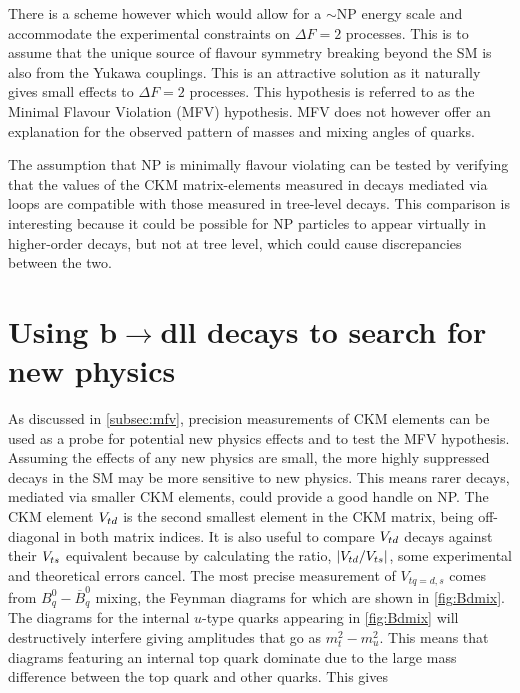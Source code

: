 There is a scheme however which would allow for a $\sim$\tev NP energy scale and accommodate the experimental constraints on $\Delta F = 2$ processes. This is to assume that the unique source of flavour symmetry breaking beyond the SM is also from the Yukawa couplings. This is an attractive solution as it naturally gives small effects to $\Delta F = 2$ processes. This hypothesis is referred to as the Minimal Flavour Violation (MFV) hypothesis. MFV does not however offer an explanation for the observed pattern of masses and mixing angles of quarks.

The assumption that NP is minimally flavour violating can be tested by verifying that the values of the CKM matrix-elements measured in decays mediated via loops are compatible with those measured in tree-level decays. This comparison is interesting because it could be possible for NP particles to appear virtually in higher-order decays, but not at tree level, which could cause discrepancies between the two.
\section[Using b\to dll decays to search for new physics]{Using $\mathbold{b\to dll}$ decays to search for new physics}

\label{sec:bdll}
As discussed in \autoref{subsec:mfv}, precision measurements of CKM elements can be used as a probe for potential new physics effects and to test the MFV hypothesis. Assuming the effects of any new physics are small, the more highly suppressed decays in the SM may be more sensitive to new physics. This means rarer decays, mediated via smaller CKM elements, could provide a good handle on NP. The CKM element ${V_{{t}{d}}}$ is the second smallest element in the CKM matrix, being off-diagonal in both matrix indices. It is also useful to compare ${V_{{t}{d}}}$ decays against their ${V_{{t}{s}}}$ equivalent because by calculating the ratio, $|{V_{{t}{d}}}/{V_{{t}{s}}}|$, some experimental and theoretical errors cancel. The most precise measurement of $V_{tq = d,s}$ comes from $B^{0}_{q} - \overline{B}^{0}_{q}$ mixing, the Feynman diagrams for which are shown in \autoref{fig:Bdmix}.
The diagrams for the internal $u$-type quarks appearing in \autoref{fig:Bdmix} will destructively interfere giving amplitudes that go as $m^{2}_{t}-m^{2}_{u}$. This means that diagrams featuring an internal top quark dominate due to the large mass difference between the top quark and other quarks. This gives

